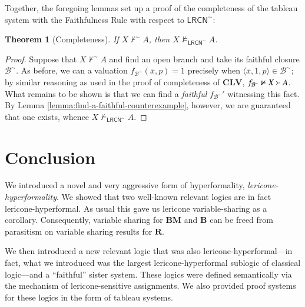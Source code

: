 \documentclass{amsart}
\newtheorem{theorem}{Theorem}
\theoremstyle{definition}
\newcommand{\LRCN}{\mathsf{LRCN}}
\newcommand{\logic}[1]{{\ensuremath {\mathbf{#1}}}}
\begin{document}
\noindent Together, the foregoing lemmas set up a proof of the completeness of the tableau system with the Faithfulness Rule with respect to $\LRCN^{\sim}$:

\begin{theorem}[Completeness]
    If $X\nvdash^{\sim} A$, then $X\nvDash_{\LRCN^{\sim}} A$.
\end{theorem}

\begin{proof}
   Suppose that $X\nvdash^{\sim}A$ and find an open branch and take its faithful closure $\mathcal{B}^{\sim}$. As before, we can a valuation $f_{\mathcal{B}^{\sim}}(\bar{x},p)=1$ precisely when $\langle\bar{x},1,p\rangle\in\mathcal{B}^{\sim}$; by similar reasoning as used in the proof of completeness of $\mathbf{CLV}$, $f_{\mathcal{B}^{\sim}}\nVdash X\Yright A$. What remains to be shown is that we can find a \emph{faithful} $f_{\mathcal{B}^{\sim}}'$ witnessing this fact. By Lemma \ref{lemma:find-a-faithful-counterexample}, however, we are guaranteed that one exists, whence $X\nvDash_{\LRCN^{\sim}}A$.
\end{proof}


\section{Conclusion}\label{Section:Conclusion}

We introduced a novel and very aggressive form of hyperformality, \textit{lericone-hyperformality}. We showed that two well-known relevant logics are in fact lericone-hyperformal. As usual this gave us lericone variable-sharing as a corollary. Consequently, variable sharing  for $\logic{BM} $ and $\logic{B}$ can be freed from parasitism on variable sharing results for $\mathbf{R}$. 

We then introduced a new relevant logic that was also lericone-hyperformal---in fact, what we introduced was the largest lericone-hyperformal sublogic of classical logic---and a ``faithful'' sister system. These logics were defined semantically via the mechanism of lericone-sensitive assignments. We also provided proof systems for these logics in the form of tableau systems. 
\end{document}
